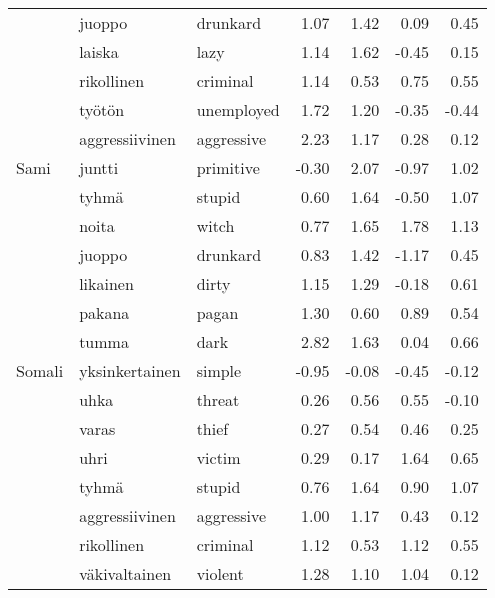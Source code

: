 \begin{tabular}{lllrrrr}
       & juoppo & drunkard &         1.07 &                 1.42 &              0.09 &                      0.45 \\
       & laiska & lazy &         1.14 &                 1.62 &             -0.45 &                      0.15 \\
       & rikollinen & criminal &         1.14 &                 0.53 &              0.75 &                      0.55 \\
       & työtön & unemployed &         1.72 &                 1.20 &             -0.35 &                     -0.44 \\
       & aggressiivinen & aggressive &         2.23 &                 1.17 &              0.28 &                      0.12 \\
Sami & juntti & primitive &        -0.30 &                 2.07 &             -0.97 &                      1.02 \\
       & tyhmä & stupid &         0.60 &                 1.64 &             -0.50 &                      1.07 \\
       & noita & witch &         0.77 &                 1.65 &              1.78 &                      1.13 \\
       & juoppo & drunkard &         0.83 &                 1.42 &             -1.17 &                      0.45 \\
       & likainen & dirty &         1.15 &                 1.29 &             -0.18 &                      0.61 \\
       & pakana & pagan &         1.30 &                 0.60 &              0.89 &                      0.54 \\
       & tumma & dark &         2.82 &                 1.63 &              0.04 &                      0.66 \\
Somali & yksinkertainen & simple &        -0.95 &                -0.08 &             -0.45 &                     -0.12 \\
       & uhka & threat &         0.26 &                 0.56 &              0.55 &                     -0.10 \\
       & varas & thief &         0.27 &                 0.54 &              0.46 &                      0.25 \\
       & uhri & victim &         0.29 &                 0.17 &              1.64 &                      0.65 \\
       & tyhmä & stupid &         0.76 &                 1.64 &              0.90 &                      1.07 \\
       & aggressiivinen & aggressive &         1.00 &                 1.17 &              0.43 &                      0.12 \\
       & rikollinen & criminal &         1.12 &                 0.53 &              1.12 &                      0.55 \\
       & väkivaltainen & violent &         1.28 &                 1.10 &              1.04 &                      0.12 \\
\bottomrule
\end{tabular}
